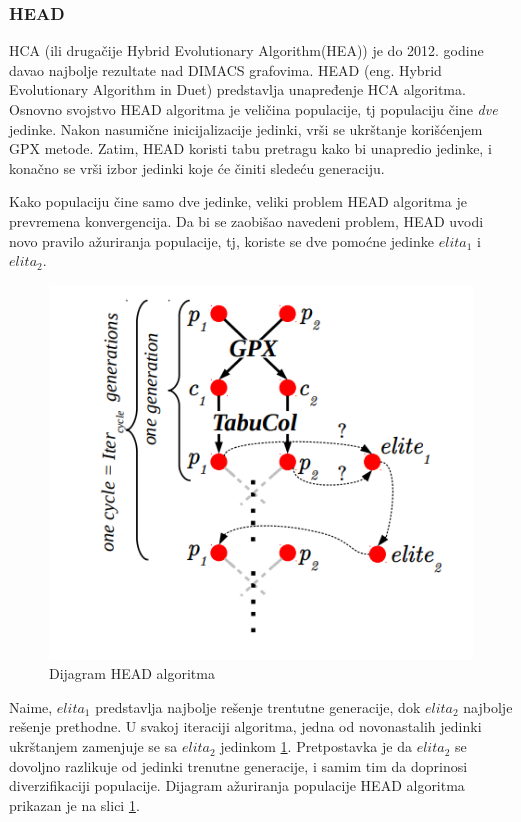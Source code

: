\documentclass[a4paper]{article}
\begin{document}
\subsubsection{HEAD}
HCA (ili drugačije Hybrid Evolutionary Algorithm(HEA)) je do 2012. godine davao najbolje rezultate nad DIMACS \cite{10.5555/548182} grafovima. HEAD (eng. Hybrid Evolutionary Algorithm in Duet) \cite{moalic2018variations} predstavlja unapređenje HCA algoritma. Osnovno svojstvo HEAD algoritma je veličina populacije, tj populaciju čine \textit{dve} jedinke. Nakon nasumične inicijalizacije jedinki, vrši se ukrštanje korišćenjem GPX metode. Zatim, HEAD koristi tabu pretragu kako bi unapredio jedinke, i konačno se vrši izbor jedinki koje će činiti sledeću generaciju. 

Kako populaciju čine samo dve jedinke, veliki problem HEAD algoritma je prevremena konvergencija. Da bi se zaobišao navedeni problem, HEAD uvodi novo pravilo ažuriranja populacije, tj, koriste se dve pomoćne jedinke $elita_1$ i $elita_2$.

\begin{figure}[h!]
\centering
\includegraphics[scale=0.5]{head_algoritam}
\caption{Dijagram HEAD algoritma}
\label{head_algoritam}
\end{figure}

Naime, $elita_1$ predstavlja najbolje rešenje trentutne generacije, dok $elita_2$ najbolje rešenje prethodne. U svakoj iteraciji algoritma, jedna od novonastalih jedinki ukrštanjem zamenjuje se sa $elita_2$ jedinkom \ref{head_algoritam}. Pretpostavka je da $elita_2$ se dovoljno razlikuje od jedinki trenutne generacije, i samim tim da doprinosi diverzifikaciji populacije. Dijagram ažuriranja populacije HEAD algoritma prikazan je na slici \ref{head_algoritam}.
\end{document}
